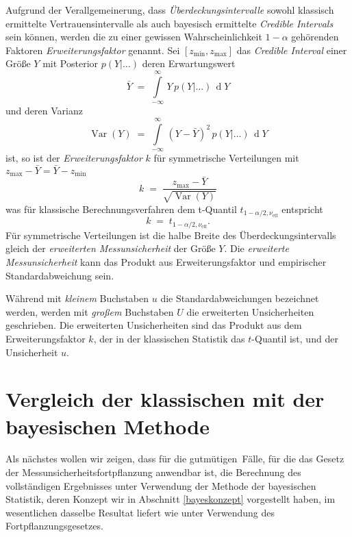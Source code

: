 Aufgrund der Verallgemeinerung, dass \textsl{Überdeckungsintervalle} sowohl
klassisch ermittelte Vertrauensintervalle als auch bayesisch ermittelte
\textsl{Credible Intervals} sein können,
werden die zu einer gewissen Wahrscheinlichkeit $1-\alpha$ gehörenden Faktoren
\textsl{Erweiterungsfaktor} genannt. Sei  $[z_\mathrm{min}, z_\mathrm{max}]$
das \textsl{Credible Interval}
einer Größe $Y$ mit Posterior $p(Y |\dots)$ deren Erwartungswert
\begin{equation}
\bar Y \; = \; \int\limits_{-\infty}^\infty \, Y \, p(Y |\dots) \, \operatorname{d}Y
\end{equation}
und deren Varianz
\begin{equation}
\operatorname{Var}(Y) \; = \; \int\limits_{-\infty}^\infty \, (Y - \bar Y)^2 \, p(Y |\dots) \, \operatorname{d}Y
\end{equation}
ist, so ist der \textsl{Erweiterungsfaktor} $k$ für symmetrische Verteilungen mit
$z_\mathrm{max} - \bar Y = \bar Y - z_\mathrm{min}$
\begin{equation}
k \; = \; \frac{z_\mathrm{max} - \bar Y}{\sqrt{\operatorname{Var}(Y)}}
\end{equation}
was für klassische Berechnungsverfahren dem
t-Quantil $t_{1-\alpha/2,\nu_\mathrm{eff}}$ entspricht
\begin{equation}
k \; = \; t_{1-\alpha/2,\nu_\mathrm{eff}} .
\end{equation}
Für symmetrische Verteilungen ist die halbe Breite des Überdeckungsintervalls
gleich der \textsl{erweiterten Messunsicherheit} der Größe $Y$. Die
\textsl{erweiterte Messunsicherheit} kann das Produkt aus
Erweiterungsfaktor und empirischer Standardabweichung sein.

Während mit \textsl{kleinem} Buchstaben $u$ die Standardabweichungen bezeichnet werden,
werden mit \textsl{großem} Buchstaben $U$ die erweiterten Unsicherheiten geschrieben. Die
erweiterten Unsicherheiten sind das Produkt aus
dem Erweiterungsfaktor $k$, der in der klassischen Statistik das $t$-Quantil ist,
und der Unsicherheit $u$.

\section{Vergleich der klassischen mit der bayesischen Methode}
\label{MUFklassischvsbayes}

Als nächstes wollen wir zeigen, dass für die \glqq gutmütigen\grqq ~Fälle, für die das
Gesetz der Mess\-un\-sicher\-heits\-fort\-pflanz\-ung anwendbar ist, die Berechnung des vollständigen
Ergebnisses unter Verwendung der Methode der bayesischen Statistik, deren Konzept wir in
Abschnitt \ref{bayeskonzept} vorgestellt haben, im wesentlichen dasselbe
Resultat liefert wie unter Verwendung des Fort\-pflanz\-ungs\-gesetzes.

